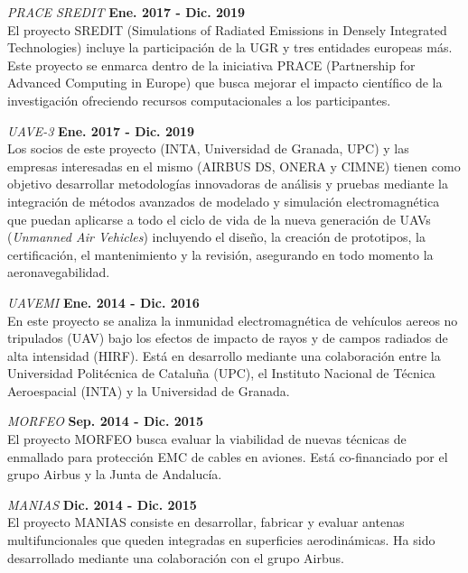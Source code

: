 \documentclass[a4paper,margin,line]{res}
\begin{document}
\begin{resume}
\begin{minipage}{\textwidth}
  {\em PRACE SREDIT} \hfill {\bf Ene. 2017 - Dic. 2019}\\
  El proyecto SREDIT (Simulations of Radiated Emissions in Densely Integrated Technologies) incluye la participación de la UGR y tres entidades europeas más. Este proyecto se enmarca dentro de la iniciativa PRACE (Partnership for Advanced Computing in Europe) que busca mejorar el impacto científico de la investigación ofreciendo recursos computacionales a los participantes.
\end{minipage}

\begin{minipage}{\textwidth}
  {\em UAVE-3} \hfill {\bf Ene. 2017 - Dic. 2019}\\
  Los socios de este proyecto (INTA, Universidad de Granada, UPC) y las empresas interesadas en el mismo (AIRBUS DS, ONERA y CIMNE) tienen como objetivo desarrollar metodologías innovadoras de análisis y pruebas mediante la integración de métodos avanzados de modelado y simulación electromagnética que puedan aplicarse a todo el ciclo de vida de la nueva generación de UAVs (\textit{Unmanned Air Vehicles}) incluyendo el diseño, la creación de prototipos, la certificación, el mantenimiento y la revisión, asegurando en todo momento la aeronavegabilidad.
\end{minipage}

\begin{minipage}{\textwidth}
  {\em UAVEMI} \hfill {\bf Ene. 2014 - Dic. 2016}\\
  En este proyecto se analiza la inmunidad electromagnética de vehículos aereos no tripulados (UAV) bajo los efectos de impacto de rayos y de campos radiados de alta intensidad (HIRF). Está en desarrollo mediante una colaboración entre la Universidad Politécnica de Cataluña (UPC), el Instituto Nacional de Técnica Aeroespacial (INTA) y la Universidad de Granada.
\end{minipage}

\begin{minipage}{\textwidth}
 {\em MORFEO} \hfill {\bf Sep. 2014 - Dic. 2015}\\
 El proyecto MORFEO busca evaluar la viabilidad de nuevas técnicas de enmallado para protección EMC de cables en aviones. Está co-financiado por el grupo Airbus y la Junta de Andalucía.
\end{minipage}

\begin{minipage}{\textwidth}
{\em MANIAS} \hfill {\bf Dic. 2014 - Dic. 2015}\\
El proyecto MANIAS consiste en desarrollar, fabricar y evaluar antenas multifuncionales que queden integradas en superficies aerodinámicas. Ha sido desarrollado mediante una colaboración con el grupo Airbus.
\end{minipage}


\end{resume}
\end{document}
